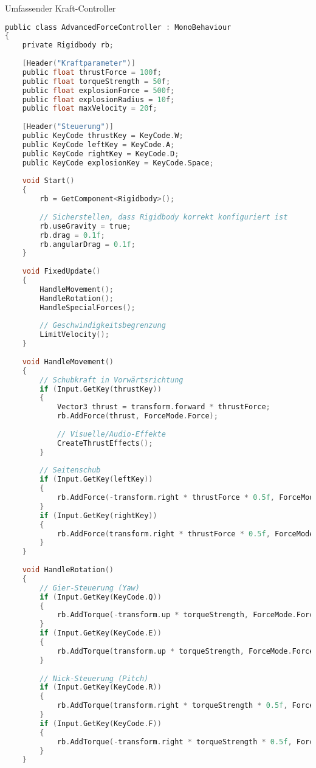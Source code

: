 \begin{code}{Umfassender Kraft-Controller}\\
\begin{lstlisting}[language=C, style=basesmol]
public class AdvancedForceController : MonoBehaviour 
{
    private Rigidbody rb;
    
    [Header("Kraftparameter")]
    public float thrustForce = 100f;
    public float torqueStrength = 50f;
    public float explosionForce = 500f;
    public float explosionRadius = 10f;
    public float maxVelocity = 20f;
    
    [Header("Steuerung")]
    public KeyCode thrustKey = KeyCode.W;
    public KeyCode leftKey = KeyCode.A;
    public KeyCode rightKey = KeyCode.D;
    public KeyCode explosionKey = KeyCode.Space;
    
    void Start() 
    {
        rb = GetComponent<Rigidbody>();
        
        // Sicherstellen, dass Rigidbody korrekt konfiguriert ist
        rb.useGravity = true;
        rb.drag = 0.1f;
        rb.angularDrag = 0.1f;
    }
    
    void FixedUpdate() 
    {
        HandleMovement();
        HandleRotation();
        HandleSpecialForces();
        
        // Geschwindigkeitsbegrenzung
        LimitVelocity();
    }
    
    void HandleMovement() 
    {
        // Schubkraft in Vorwärtsrichtung
        if (Input.GetKey(thrustKey)) 
        {
            Vector3 thrust = transform.forward * thrustForce;
            rb.AddForce(thrust, ForceMode.Force);
            
            // Visuelle/Audio-Effekte
            CreateThrustEffects();
        }
        
        // Seitenschub
        if (Input.GetKey(leftKey)) 
        {
            rb.AddForce(-transform.right * thrustForce * 0.5f, ForceMode.Force);
        }
        if (Input.GetKey(rightKey)) 
        {
            rb.AddForce(transform.right * thrustForce * 0.5f, ForceMode.Force);
        }
    }
    
    void HandleRotation() 
    {
        // Gier-Steuerung (Yaw)
        if (Input.GetKey(KeyCode.Q)) 
        {
            rb.AddTorque(-transform.up * torqueStrength, ForceMode.Force);
        }
        if (Input.GetKey(KeyCode.E)) 
        {
            rb.AddTorque(transform.up * torqueStrength, ForceMode.Force);
        }
        
        // Nick-Steuerung (Pitch)
        if (Input.GetKey(KeyCode.R)) 
        {
            rb.AddTorque(transform.right * torqueStrength * 0.5f, ForceMode.Force);
        }
        if (Input.GetKey(KeyCode.F)) 
        {
            rb.AddTorque(-transform.right * torqueStrength * 0.5f, ForceMode.Force);
        }
    }
    

\end{lstlisting}
\end{code}
